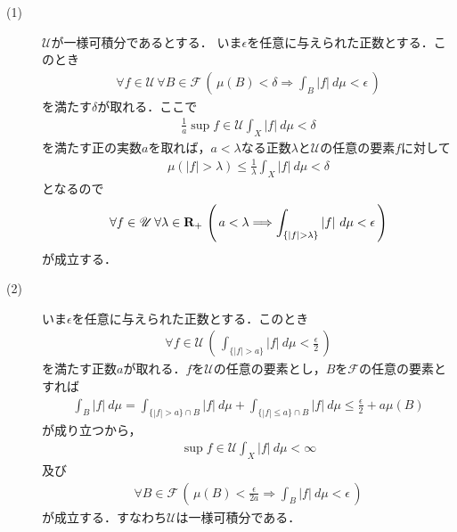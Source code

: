 	\begin{sketch}\mbox{}
		\begin{description}
			\item[(1)]
				$\mathscr{U}$が一様可積分であるとする．
				いま$\epsilon$を任意に与えられた正数とする．このとき
				\begin{align}
					\forall f \in \mathscr{U}\, \forall B \in \mathscr{F}\, \left(\, \mu(B) < \delta
					\Longrightarrow \int_B |f|\ d\mu < \epsilon\, \right)
				\end{align}
				を満たす$\delta$が取れる．ここで
				\begin{align}
					\frac{1}{a}\sup{f \in \mathscr{U}}{\int_X|f|\ d\mu} < \delta
				\end{align}
				を満たす正の実数$a$を取れば，$a < \lambda$なる正数$\lambda$と$\mathscr{U}$の任意の要素$f$に対して
				\begin{align}
					\mu(|f| > \lambda) \leq \frac{1}{\lambda} \int_X |f|\ d\mu < \delta
				\end{align}
				となるので
				\begin{align}
					\forall f \in \mathscr{U}\, \forall \lambda \in \mathbf{R}_+\,
					\left(\, a < \lambda \Longrightarrow \int_{\{|f| > \lambda\}} |f|\ d\mu < \epsilon\, \right)
				\end{align}
				が成立する．
			
			\item[(2)]
				いま$\epsilon$を任意に与えられた正数とする．このとき
				\begin{align}
					\forall f \in \mathscr{U}\, 
					\left(\, \int_{\{|f| > a\}} |f|\ d\mu < \frac{\epsilon}{2}\, \right)
				\end{align}
				を満たす正数$a$が取れる．$f$を$\mathscr{U}$の任意の要素とし，$B$を$\mathscr{F}$の任意の要素とすれば
				\begin{align}
					\int_B |f|\ d\mu
					= \int_{\{|f|>a\} \cap B} |f|\ d\mu
						+ \int_{\{|f| \leq a\} \cap B} |f|\ d\mu
					\leq \frac{\epsilon}{2} + a\mu(B)
				\end{align}				
				が成り立つから，
				\begin{align}
					\sup{f \in \mathscr{U}}\int_X|f|\ d\mu < \infty
				\end{align}
				及び
				\begin{align}
					\forall B \in \mathscr{F}\, \left(\, \mu(B) < \frac{\epsilon}{2a}
					\Longrightarrow \int_B |f|\ d\mu < \epsilon\, \right)
				\end{align}
				が成立する．すなわち$\mathscr{U}$は一様可積分である．
				\QED
		\end{description}
	\end{sketch}
	
